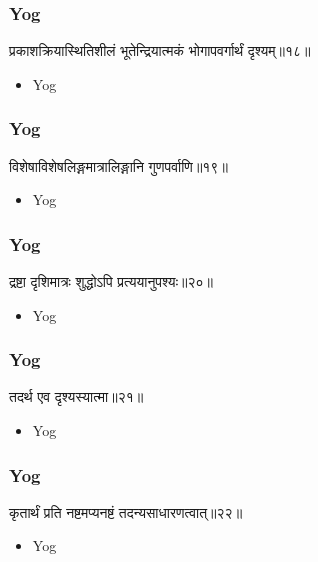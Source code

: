 \begin{frame}[fragile]\frametitle{Yog}
\begin{sanskrit}
प्रकाशक्रियास्थितिशीलं भूतेन्द्रियात्मकं भोगापवर्गार्थं दृश्यम्॥१८॥
\end{sanskrit}
	\begin{itemize}
	\item Yog 
	\end{itemize}
\end{frame}


\begin{frame}[fragile]\frametitle{Yog}
\begin{sanskrit}
विशेषाविशेषलिङ्गमात्रालिङ्गानि गुणपर्वाणि॥१९॥
\end{sanskrit}
	\begin{itemize}
	\item Yog 
	\end{itemize}
\end{frame}

\begin{frame}[fragile]\frametitle{Yog}
\begin{sanskrit}
द्रष्टा दृशिमात्रः शुद्धोऽपि प्रत्ययानुपश्यः॥२०॥
\end{sanskrit}
	\begin{itemize}
	\item Yog 
	\end{itemize}
\end{frame}


\begin{frame}[fragile]\frametitle{Yog}
\begin{sanskrit}
तदर्थ एव दृश्यस्यात्मा॥२१॥
\end{sanskrit}
	\begin{itemize}
	\item Yog 
	\end{itemize}
\end{frame}


\begin{frame}[fragile]\frametitle{Yog}
\begin{sanskrit}
कृतार्थं प्रति नष्टमप्यनष्टं तदन्यसाधारणत्वात्॥२२॥
\end{sanskrit}
	\begin{itemize}
	\item Yog 
	\end{itemize}
\end{frame}


